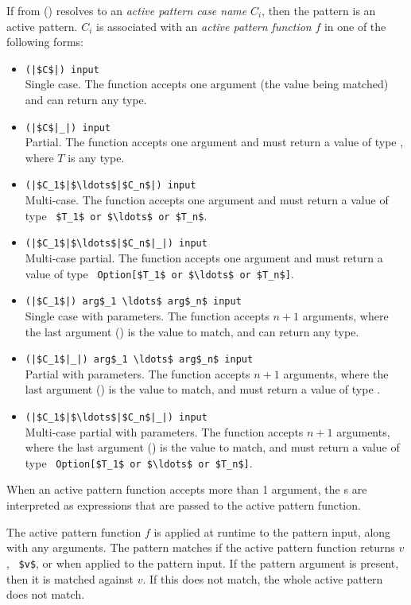 If  from () resolves to an {\em active pattern case name} $C_i$, then the pattern is an active pattern. $C_i$ is associated with an {\em active pattern function} $f$ in one of the following forms:
\begin{itemize}
  \item \lstinline!(|$C$|) input! \\
    Single case. The function accepts one argument (the value being matched) and can return any type. 
  \item \lstinline!(|$C$|_|) input! \\
    Partial. The function accepts one argument and must return a value of type , where $T$ is any type. 
  \item \lstinline!(|$C_1$|$\ldots$|$C_n$|) input! \\
    Multi-case. The function accepts one argument and must return a value of type ~\lstinline!$T_1$ or $\ldots$ or $T_n$!. 
  \item \lstinline!(|$C_1$|$\ldots$|$C_n$|_|) input! \\
    Multi-case partial. The function accepts one argument and must return a value of type ~\lstinline!Option[$T_1$ or $\ldots$ or $T_n$]!. 
  \item \lstinline!(|$C_1$|) arg$_1 \ldots$ arg$_n$ input! \\
    Single case with parameters. The function accepts $n+1$ arguments, where the last argument () is the value to match, and can return any type. 
  \item \lstinline!(|$C_1$|_|) arg$_1 \ldots$ arg$_n$ input! \\
    Partial with parameters. The function accepts $n+1$ arguments, where the last argument () is the value to match, and must return a value of type . 
  \item \lstinline!(|$C_1$|$\ldots$|$C_n$|_|) input! \\
    Multi-case partial with parameters. The function accepts $n+1$ arguments, where the last argument () is the value to match, and must return a value of type ~\lstinline!Option[$T_1$ or $\ldots$ or $T_n$]!.
\end{itemize}

When an active pattern function accepts more than 1 argument, the s are interpreted as expressions that are passed to the active pattern function. 

The active pattern function $f$ is applied at runtime to the pattern input, along with any arguments. The pattern matches if the active pattern function returns $v$, ~\lstinline!$v$!, or  when applied to the pattern input. If the pattern argument  is present, then it is matched against $v$. If this does not match, the whole active pattern does not match. 

